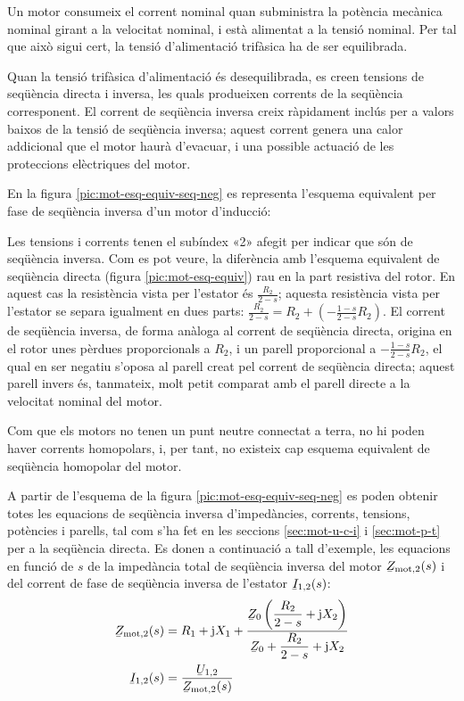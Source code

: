 Un motor consumeix el corrent nominal quan subministra la potència mecànica nominal girant a la velocitat nominal, i està alimentat a la tensió nominal. Per tal que això sigui cert, la tensió d'alimentació trifàsica ha de ser equilibrada.

Quan la tensió trifàsica d'alimentació és desequilibrada, es creen tensions de seqüència directa i inversa, les quals  produeixen corrents de la seqüència corresponent. El corrent de seqüència inversa creix ràpidament inclús per a valors baixos de  la tensió de seqüència inversa; aquest corrent genera una calor addicional que el motor haurà d'evacuar, i una possible actuació de les proteccions elèctriques del motor.

En la figura \vref{pic:mot-esq-equiv-seq-neg} es representa l'esquema equivalent per fase de seqüència inversa d'un   motor d'inducció:

\begin{center}
	
	\label{pic:mot-esq-equiv-seq-neg}
\end{center}

Les tensions i corrents tenen el subíndex «2» afegit per indicar que són de seqüència inversa. Com es pot veure, la diferència amb l'esquema equivalent de seqüència directa (figura \vref{pic:mot-esq-equiv}) rau en la part resistiva del rotor. En aquest cas la resistència vista per l'estator és $\frac{R_2}{2-s}$; aquesta resistència vista per l'estator se separa igualment en dues parts: $\frac{R_2}{2-s} = R_2 + \left(-\frac{1-s}{2-s} R_2\right)$. El corrent de seqüència inversa, de forma anàloga al corrent de seqüència directa,  origina en el rotor unes pèrdues proporcionals a $R_2$, i un parell proporcional a $-\frac{1-s}{2-s} R_2$, el qual en ser negatiu s'oposa al parell creat pel corrent de seqüència directa; aquest parell invers és, tanmateix, molt petit comparat amb el parell directe a la velocitat nominal del motor.

Com que els motors no tenen un punt neutre connectat a terra, no hi poden haver corrents homopolars, i, per tant, no existeix cap esquema equivalent de seqüència homopolar del motor.

A partir de l'esquema de la figura \vref{pic:mot-esq-equiv-seq-neg} es poden obtenir totes les equacions de seqüència inversa d'impedàncies, corrents, tensions, potències i parells, tal com s'ha fet en les seccions \ref{sec:mot-u-c-i} i \ref{sec:mot-p-t} per a la seqüència directa. Es donen a continuació a tall d'exemple, les equacions en funció de $s$ de la impedància total de seqüència inversa del motor $\cmplx{Z}\ped{mot,2}(s)$ i del corrent de fase de seqüència inversa de l'estator $\cmplx{I}_{1,2}(s)$:
\begin{align}
	\cmplx{Z}\ped{mot,2}(s) &= R_1 + \ju X_1 + \frac{\cmplx{Z}_0 \left( \dfrac{R_2}{2-s} + \ju X_2\right)}{\cmplx{Z}_0 +  \dfrac{R_2}{2-s} + \ju X_2}\label{eq:mot-Zmot-inv}\\
	\cmplx{I}_{1,2}(s) &= \frac{\cmplx{U}_{1,2}}{\cmplx{Z}\ped{mot,2}(s)}\label{eq:mot-I1-inv}
\end{align}

